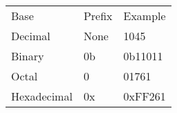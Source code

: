 \documentclass[]{article}
\begin{document}
\begin{longtable}[c]{@{}lll@{}}
\toprule
\begin{minipage}[t]{0.30\columnwidth}\raggedright\strut
Base
\strut\end{minipage} &
\begin{minipage}[t]{0.30\columnwidth}\raggedright\strut
Prefix
\strut\end{minipage} &
\begin{minipage}[t]{0.30\columnwidth}\raggedright\strut
Example
\strut\end{minipage}\tabularnewline
\begin{minipage}[t]{0.30\columnwidth}\raggedright\strut
Decimal
\strut\end{minipage} &
\begin{minipage}[t]{0.30\columnwidth}\raggedright\strut
None
\strut\end{minipage} &
\begin{minipage}[t]{0.30\columnwidth}\raggedright\strut
1045
\strut\end{minipage}\tabularnewline
\begin{minipage}[t]{0.30\columnwidth}\raggedright\strut
Binary
\strut\end{minipage} &
\begin{minipage}[t]{0.30\columnwidth}\raggedright\strut
0b
\strut\end{minipage} &
\begin{minipage}[t]{0.30\columnwidth}\raggedright\strut
0b11011
\strut\end{minipage}\tabularnewline
\begin{minipage}[t]{0.30\columnwidth}\raggedright\strut
Octal
\strut\end{minipage} &
\begin{minipage}[t]{0.30\columnwidth}\raggedright\strut
0
\strut\end{minipage} &
\begin{minipage}[t]{0.30\columnwidth}\raggedright\strut
01761
\strut\end{minipage}\tabularnewline
\begin{minipage}[t]{0.30\columnwidth}\raggedright\strut
Hexadecimal
\strut\end{minipage} &
\begin{minipage}[t]{0.30\columnwidth}\raggedright\strut
0x
\strut\end{minipage} &
\begin{minipage}[t]{0.30\columnwidth}\raggedright\strut
0xFF261
\strut\end{minipage}\tabularnewline
\bottomrule
\end{longtable}
\end{document}
